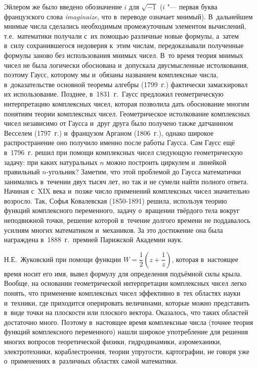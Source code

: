 Эйлером же было введено обозначение $i$ для $\sqrt{-1}$ ($i$ "--- первая
буква французского слова \textit{imaginaize}, что в~переводе означает мнимый).
В~дальнейшем мнимые числа сделались необходимым промежуточным элементом
вычислений, т.е.\ математики получали с~их помощью различные новые формулы,
а~затем в~силу сохранившегося недоверия к~этим числам, передоказывали
полученные формулы заново без использования мнимых чисел. В~то время теория
мнимых чисел не была логически обоснована и~допускала двусмысленные
истолкования, поэтому Гаусс, которому мы и~обязаны названием комплексные
числа, в~доказательстве основной теоремы алгебры (1799~г.) фактически
замаскировал их использование. Позднее, в~1831~г.\ Гаусс предложил
геометрическую интерпретацию комплексных чисел, которая позволила дать
обоснование многим понятиям теории комплексных чисел. Геометрическое
истолкование комплексных чисел независимо от Гаусса и~друг друга было
получено также датчанином Весселем (1797~г.) и~французом Арганом (1806~г.),
однако широкое распространение оно получило именно после работы Гаусса.
Сам Гаусс ещё в~1796~г. решил при помощи комплексных чисел следующую 
геометрическую задачу: при каких натуральных $n$ можно построить циркулем
и~линейкой правильный $n$-угольник? Заметим, что этой проблемой до Гаусса
математички занимались в~течении двух тысяч лет, но так и не сумели найти
полного ответа. Начиная с~XIX века и~позже число применений комплексных
чисел значительно возросло. Так, Софья Ковалевская (1850-1891) решила,
используя теорию функций комплексного переменного, задачу о~вращении
твёрдого тела вокруг неподвижной точки, решение которой в~течение долгого
времени не поддавалось усилиям многих математиком и~механиков. За это
достижение она была награждена в~1888~г.\ премией Парижской Академии наук.

Н.Е.~Жуковский при помощи функции
$W = \dfrac{1}{2}\left(z + \dfrac{1}{z} \right)$, которая в~настоящее время
носит его имя, вывел формулу для определения подъёмной силы крыла.
Вообще, на основании геометрической интерпретации комплексных чисел легко
понять, что применение комплексных чисел эффективно в~тех областях науки
и~техники, где приходится оперировать величинами, которые можно представить
в~виде точки на плоскости или плоского вектора. Оказалось, что таких
областей достаточно много. Поэтому в~настоящее время комплексные числа
(точнее теория функций комплексного переменного) нашли широкое употребление
для решения многих вопросов теоретической физики, гидродинамики,
аэромеханики, электротехники, кораблестроения, теории упругости,
картографии, не говоря уже о~применениях в~различных областях самой
математики.

